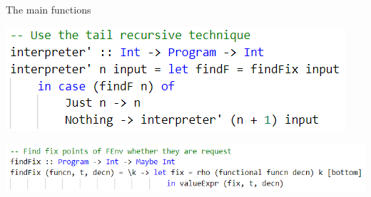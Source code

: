 \documentclass{beamer}
\begin{document}
\begin{frame}{The main functions}
	\begin{center}
		\includegraphics[scale=0.8]{img/code1}
		
	\end{center}
\vspace*{0.5cm}
\begin{center}
	\includegraphics[width=\textwidth]{img/code4}
\end{center}
\end{frame}
\end{document}
